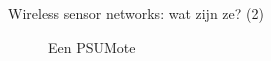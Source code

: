 \documentclass[presentation, bigger]{beamer}
\begin{document}
\begin{frame}[label=sec-1-2]{Wireless sensor networks: wat zijn ze? (2)}
\begin{figure}
\caption{Een PSUMote}
\end{figure}

\end{frame}
\end{document}
